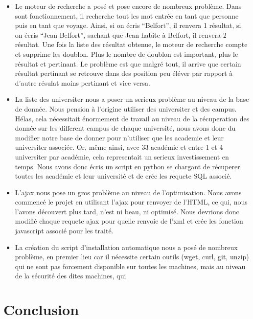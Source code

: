 \documentclass[a4paper,10pt]{report}
\begin{document}

\begin{itemize}
    \item Le moteur de recherche a pos\'e et pose encore de nombreux probl\`eme.
    Dans sont fonctionnement, il recherche tout les mot entr\'ee en tant que
    personne puis en tant que voyage. Ainsi, si on \'ecris ``Belfort'', il renvera 1 r\'esultat,
    si on \'ecris ``Jean Belfort'', sachant que Jean habite \`a Belfort, il renvera 2 r\'esultat.
    Une fois la liste des r\'esultat obtenue, le moteur de recherche compte et supprime
    les doublon. Plus le nombre de doublon est important, plus le r\'esultat et pertinant.
    Le probl\`eme est que malgr\'e tout, il arrive que certain r\'esultat pertinant se
    retrouve dans des position peu \'el\'ever par rapport \`a d'autre r\'esulat moins pertinant
    et vice versa.
    
    \null
    
    \item La liste des universiter nous a poser un serieux probl\`eme au niveau de la
    base de donn\'ee. Nous pension \`a l'origine utiliser des universiter et des campus.
    H\'elas, cela n\'ecessitait \'enormement de travail au niveau de la r\'ecuperation
    des donn\'ee sur les different campus de chaque universit\'e, nous avons donc du
    modifier notre base de donner pour n'utiliser que les academie et leur universiter
    associ\'ee. Or, m\^eme ainsi, avec 33 acad\'emie et entre 1 et 4 universiter par
    acad\'emie, cela representait un serieux investissement en temps. Nous avons donc
    \'ecris un script en python se chargant de r\'ecuperer toutes les acad\'emie et
    leur universit\'e et de cr\'ee les requete SQL associ\'e.
    
    \null
    
    \item L'ajax nous pose un gros probl\`eme au niveau de l'optimisation. Nous avons
    commenc\'e le projet en utilisant l'ajax pour renvoyer de l'HTML, ce qui, nous l'avons
    d\'ecouvert plus tard, n'est ni beau, ni optimis\'e. Nous devrions donc modifi\'e
    chaque requete ajax pour quelle renvoie de l'xml et cr\'ee les fonction javascript
    associ\'e pour les trait\'e.

    \null
    
    \item La cr\'eation du script d'installation automatique nous a pos\'e de nombreux
    probl\`eme, en premier lieu car il n\'ecessite certain outils (wget, curl, git, unzip)
    qui ne sont pas forcement disponible sur toutes les machines, mais au niveau de la
    s\'ecurit\'e des dites machines, qui 
\end{itemize}


\chapter*{Conclusion}
\end{document}
